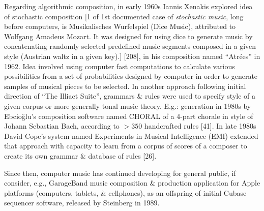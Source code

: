 \documentclass{article}
\begin{document}
\begin{itemize}
\begin{itemize}
\begin{itemize}
			Regarding algorithmic composition, in early 1960s {\sc Iannis Xenakis} explored idea of stochastic composition [1 of 1st documented case of {\it stochastic music}, long before computers, is Musikalisches Wurfelspiel (Dice Music), attributed to {\sc Wolfgang Amadeus Mozart}. It was designed for using dice to generate music by concatenating randomly selected predefined music segments composed in a given style (Austrian waltz in a given key).] [208], in his composition named ``Atr\'ees'' in 1962. Idea involved using computer fast computations to calculate various possibilities from a set of probabilities designed by computer in order to generate samples of musical pieces to be selected. In another approach following initial direction of ``The Illiact Suite'', grammars \& rules were used to specify style of a given corpus or more generally tonal music theory. E.g.: generation in 1980s by {\sc Ebcioğlu}'s composition software named CHORAL of a 4-part chorale in style of {\sc Johann Sebastian Bach}, according to $> 350$ handcrafted rules [41]. In late 1980s {\sc David Cope}'s system named Experiments in Musical Intelligence (EMI) extended that approach with capacity to learn from a corpus of scores of a composer to create its own grammar \& database of rules [26].

			Since then, computer music has continued developing for general public, if consider, e.g., GarageBand music composition \& production application for Apple platforms (computers, tablets, \& cellphones), as an offspring of initial Cubase sequencer software, released by {\sc Steinberg} in 1989.


\end{itemize}
\end{itemize}
\end{itemize}
\end{document}
